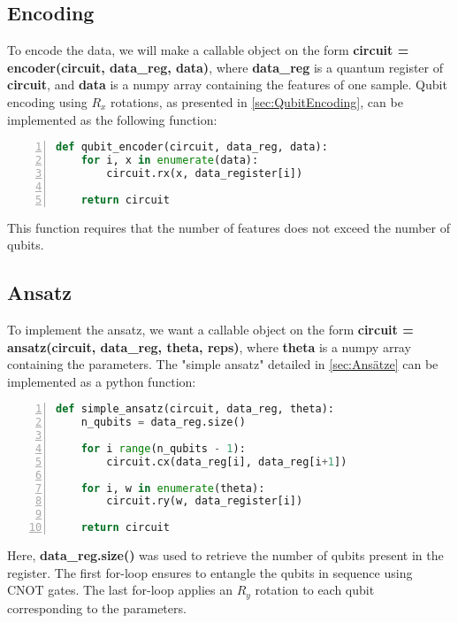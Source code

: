 \subsection{Encoding}

To encode the data, we will make a callable object on the form \textbf{circuit = encoder(circuit, data\_reg, data)}, where \textbf{data\_reg} is a quantum register of \textbf{circuit}, and \textbf{data} is a numpy array containing the features of one sample. Qubit encoding using $R_x$ rotations, as presented in \autoref{sec:QubitEncoding}, can be implemented as the following function:

\begin{lstlisting}[language=python, numbers=left]
def qubit_encoder(circuit, data_reg, data):
    for i, x in enumerate(data):
        circuit.rx(x, data_register[i])
        
    return circuit
\end{lstlisting}

This function requires that the number of features does not exceed the number of qubits.

\subsection{Ansatz}
To implement the ansatz, we want a callable object on the form 
\textbf{circuit = ansatz(circuit, data\_reg, theta, reps)}, where \textbf{theta} is a numpy array containing the parameters. The "simple ansatz" detailed in \autoref{sec:Ansätze} can be implemented as a python function:

\begin{lstlisting}[language=python, numbers=left]
def simple_ansatz(circuit, data_reg, theta):
    n_qubits = data_reg.size()
    
    for i range(n_qubits - 1):
        circuit.cx(data_reg[i], data_reg[i+1])
    
    for i, w in enumerate(theta):
        circuit.ry(w, data_register[i])
        
    return circuit
\end{lstlisting}
Here, \textbf{data\_reg.size()} was used to retrieve the number of qubits present in the register. The first for-loop ensures to entangle the qubits in sequence using CNOT gates. The last for-loop applies an $R_y$ rotation to each qubit corresponding to the parameters.

